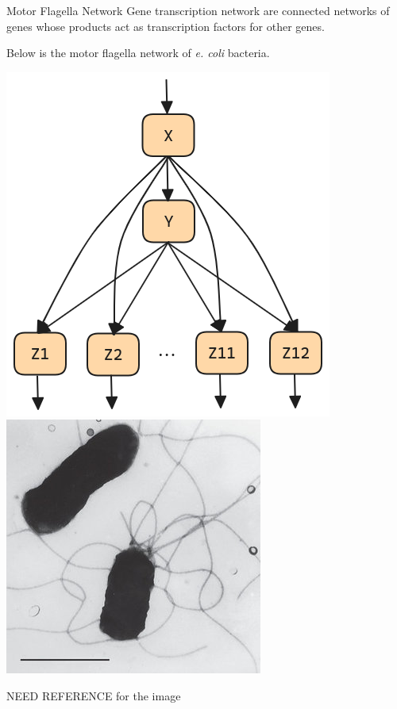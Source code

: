 \documentclass{beamer}
\begin{document}
\begin{frame}{Motor Flagella Network}
    Gene transcription network are connected networks of genes whose products act as transcription factors for other genes.

    \vspace*{0.125in}
    Below is the motor flagella network of \textit{e. coli} bacteria.

    \begin{center}
        \includegraphics[scale=0.25]{multioutput_FFL_color.png}
        \hspace*{0.25in}
        \includegraphics[scale=0.35]{Flagella-of-E-coli-observed-in-transmission-electron-microscope-Bar-1mm_Q320-2724765803.jpg}
    \end{center}

    NEED REFERENCE for the image
\end{frame}
\end{document}
